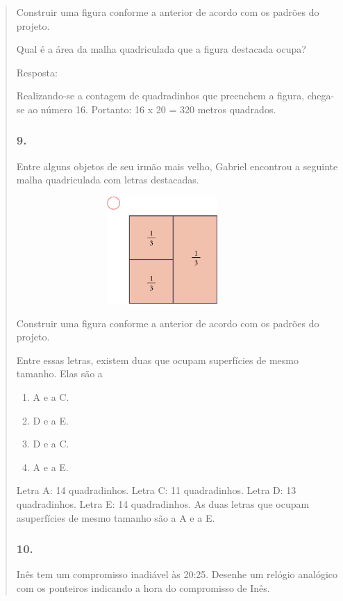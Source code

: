\begin{enumerate}
\begin{escolha}
\begin{enumerate}
\begin{itemize}
\begin{itemize}
\begin{escolha}
\begin{quote}
Construir uma figura conforme a anterior de acordo com os padrões do
projeto.

Qual é a área da malha quadriculada que a figura destacada ocupa?

Resposta:

Realizando-se a contagem de quadradinhos que preenchem a figura, chega-se
ao número 16. Portanto: 16 x 20 = 320 metros quadrados.

\subsubsection{9.}\label{section-60}

Entre alguns objetos de seu irmão mais velho, Gabriel encontrou a seguinte
malha quadriculada com letras destacadas.

\includegraphics[width=4.36538in,height=1.60417in]{media/image69.png}

Construir uma figura conforme a anterior de acordo com os padrões do
projeto.

Entre essas letras, existem duas que ocupam superfícies de mesmo tamanho. Elas
são a

\begin{enumerate}
\def\labelenumi{\alph{enumi})}
\item
  A e a C.
\item
  D e a E.
\item
  D e a C.
\item
  A e a E.
\end{enumerate}

Letra A: 14 quadradinhos.
Letra C: 11 quadradinhos.
Letra D: 13 quadradinhos.
Letra E: 14 quadradinhos.
As duas letras que ocupam asuperfícies de mesmo tamanho são a A e a E.

\subsubsection{10.}\label{section-61}

Inês tem um compromisso inadiável às 20:25. Desenhe um relógio analógico
com os ponteiros indicando a hora do compromisso de Inês.


\end{quote}
\end{escolha}
\end{itemize}
\end{itemize}
\end{enumerate}
\end{escolha}
\end{enumerate}
